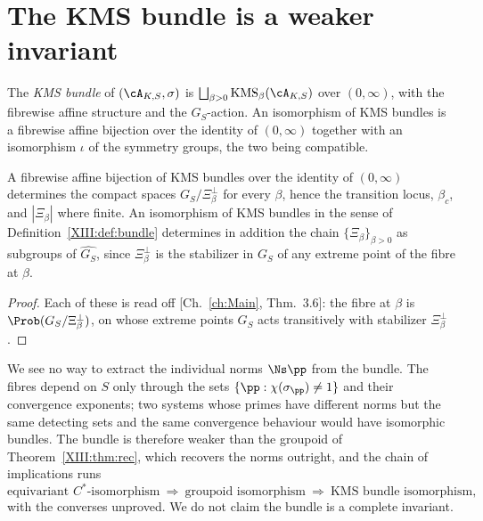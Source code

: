 \section{The KMS bundle is a weaker invariant}

\begin{definition}\label{XIII:def:bundle}
The \emph{KMS bundle} of $(\cA_{K,S},\sigma)$ is
$\bigsqcup_{\beta>0}\mathrm{KMS}_\beta(\cA_{K,S})$ over $(0,\infty)$, with the fibrewise
affine structure and the $G_S$-action. An isomorphism of KMS bundles is a fibrewise affine
bijection over the identity of $(0,\infty)$ together with an isomorphism $\iota$ of the
symmetry groups, the two being compatible.
\end{definition}

\begin{proposition}\label{XIII:prop:bundle}
A fibrewise affine bijection of KMS bundles over the identity of $(0,\infty)$ determines the
compact spaces $G_S/\Xi_\beta^\perp$ for every $\beta$, hence the transition locus, $\beta_c$,
and $|\Xi_\beta|$ where finite. An isomorphism of KMS bundles in the sense of
Definition~\ref{XIII:def:bundle} determines in addition the chain $\{\Xi_\beta\}_{\beta>0}$ as
subgroups of $\widehat{G_S}$, since $\Xi_\beta^\perp$ is the stabilizer in $G_S$ of any extreme
point of the fibre at $\beta$.
\end{proposition}

\begin{proof}
Each of these is read off [Ch.~\ref{ch:Main}, Thm.~3.6]: the fibre at $\beta$ is
$\Prob(G_S/\Xi_\beta^\perp)$, on whose extreme points $G_S$ acts transitively with
stabilizer $\Xi_\beta^\perp$.
\end{proof}

\begin{remark}\label{XIII:rem:bundleweak}
We see no way to extract the individual norms $\Ns\pp$ from the bundle. The fibres depend on
$S$ only through the sets $\{\pp:\chi(\sigma_\pp)\ne1\}$ and their convergence exponents; two
systems whose primes have different norms but the same detecting sets and the same
convergence behaviour would have isomorphic bundles. The bundle is therefore weaker than the
groupoid of Theorem~\ref{XIII:thm:rec}, which recovers the norms outright, and the chain of
implications runs
\[
\text{equivariant }C^*\text{-isomorphism}\ \Longrightarrow\ \text{groupoid isomorphism}\ \Longrightarrow\ \text{KMS bundle isomorphism},
\]
with the converses unproved. We do not claim the bundle is a complete invariant.
\end{remark}

